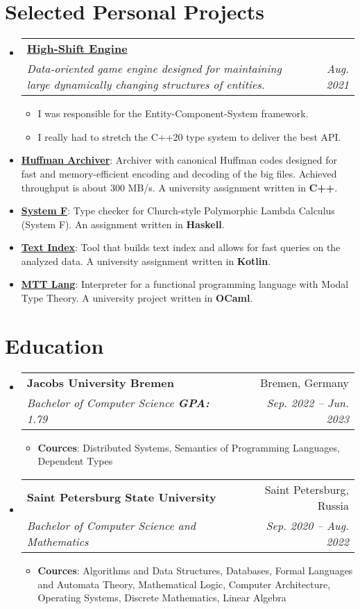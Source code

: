 \documentclass[letterpaper,11pt]{article}
\makeatletter
\newcommand{\resumeItem}[2]{
  \item\small{
    \textbf{#1}{: #2 \vspace{-2pt}}
  }
}
\newcommand{\resumeSubheading}[4]{
  \vspace{-1pt}\item
    \begin{tabular*}{0.97\textwidth}{l@{\extracolsep{\fill}}r}
      \textbf{#1} & #2 \\
      \textit{\small#3} & \textit{\small #4} \\
    \end{tabular*}\vspace{-5pt}
}
\newcommand{\resumeSubItem}[2]{\resumeItem{#1}{#2}\vspace{-4pt}}
\newcommand{\resumeSubHeadingListStart}{\begin{itemize}[leftmargin=*]}
\newcommand{\resumeSubHeadingListEnd}{\end{itemize}}
\newcommand{\startList}{\begin{itemize} \small}
\newcommand{\finishList}{\end{itemize} \vspace{-5pt}}
\makeatother
\begin{document}
\section{Selected Personal Projects}
  \resumeSubHeadingListStart
    \resumeSubheading
      {\href{https://github.com/bot-mne-v-rot/high-shift-engine}{High-Shift Engine}}{}
      {Data-oriented game engine designed for maintaining large dynamically changing structures of entities.}{Aug. 2021}
        \startList
          \item I was responsible for the Entity-Component-System framework.
          \item I really had to stretch the C++20 type system to deliver the best API.
        \finishList
    \resumeSubItem{\href{https://github.com/SmnTin/huffman-archiver}{Huffman Archiver}}
      {Archiver with canonical Huffman codes designed for fast and memory-efficient encoding and decoding of the big files. Achieved throughput is about 300 MB/s. A university assignment written in \textbf{C++}.}
    \resumeSubItem{\href{https://github.com/SmnTin/simple-type-checker/tree/system-f}{System F}}
      {Type checker for Church-style Polymorphic Lambda Calculus (System F). An assignment written in \textbf{Haskell}.}
    \resumeSubItem{\href{https://github.com/SmnTin/prog-2020-text-index-SmnTin}{Text Index}}
      {Tool that builds text index and allows for fast queries on the analyzed data.  A university assignment written in \textbf{Kotlin}.}
    \resumeSubItem{\href{https://github.com/SmnTin/mtt-lang}{MTT Lang}}{Interpreter for a functional programming language with Modal Type Theory. A university project written in \textbf{OCaml}.}
  \resumeSubHeadingListEnd

\section{Education}
  \resumeSubHeadingListStart
    \resumeSubheading
      {Jacobs University Bremen}{Bremen, Germany}
      {Bachelor of Computer Science \textbf{GPA:} 1.79}{Sep. 2022 -- Jun. 2023}
      \startList
        \item \textbf{Cources}: Distributed Systems, Semantics of Programming Languages, Dependent Types
      \finishList
    \resumeSubheading
      {Saint Petersburg State University}{Saint Petersburg, Russia}
      {Bachelor of Computer Science and Mathematics}{Sep. 2020 -- Aug. 2022}
      \startList
        \item \textbf{Cources}: Algorithms and Data Structures, Databases, Formal Languages and Automata Theory, Mathematical Logic, Computer Architecture, Operating Systems, Discrete Mathematics, Linear Algebra
      \finishList
  \resumeSubHeadingListEnd
\end{document}
